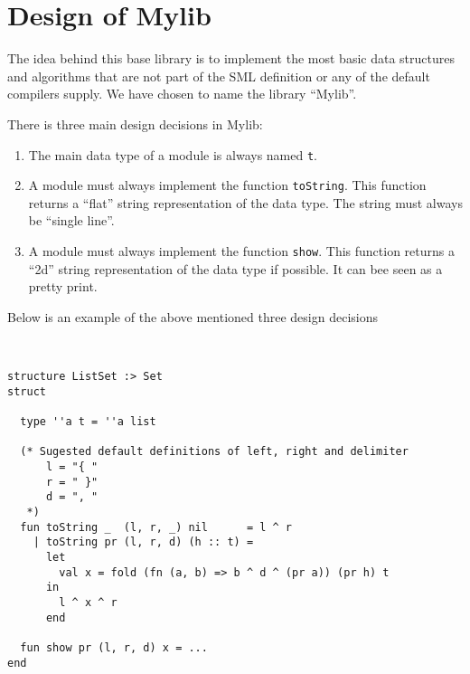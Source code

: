 \chapter{Design of Mylib}

The idea behind this base library is to implement the most basic data structures
and algorithms that are not part of the SML definition or any of the default
compilers supply. We have chosen to name the library ``Mylib''.

There is three main design decisions in Mylib:



\begin{enumerate}
\item The main data type of a module is always named \texttt{t}.

\item A module must always implement the function \texttt{toString}. This
  function returns a ``flat'' string representation of the data type. The string
  must always be ``single line''.

\item A module must always implement the function \texttt{show}. This function
  returns a ``2d'' string representation of the data type if possible. It can
  bee seen as a pretty print. 
\end{enumerate}


Below is an example of the above mentioned three design decisions

\begin{example}\
\begin{lstlisting}
structure ListSet :> Set
struct

  type ''a t = ''a list

  (* Sugested default definitions of left, right and delimiter
      l = "{ "
      r = " }"
      d = ", "
   *)
  fun toString _  (l, r, _) nil      = l ^ r
    | toString pr (l, r, d) (h :: t) =
      let
        val x = fold (fn (a, b) => b ^ d ^ (pr a)) (pr h) t 
      in
        l ^ x ^ r
      end

  fun show pr (l, r, d) x = ...
end

\end{lstlisting}
\end{example}

